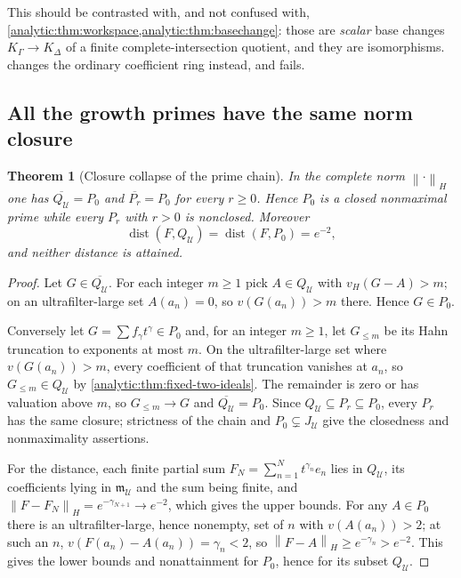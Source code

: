 \documentclass[11pt,letterpaper]{article}
\newtheorem{theorem}{Theorem}[section]
\theoremstyle{definition}
\theoremstyle{remark}
\newcommand{\UU}{\mathcal U}
\newcommand{\m}{\mathfrak m}
\newcommand{\norm}[1]{\left\lVert#1\right\rVert}
\newcommand{\vH}{v_{\!H}}
\numberwithin{equation}{section}
\begin{document}
This should be contrasted with, and not confused with,
\cref{analytic:thm:workspace,analytic:thm:basechange}: those are
\emph{scalar} base changes $K_\Gamma\to K_\Delta$ of a finite
complete-intersection quotient, and they are isomorphisms.
 changes the ordinary coefficient ring
instead, and fails.

\subsection{All the growth primes have the same norm closure}
\label{analytic:subsec:fixed-closure}
\begin{theorem}[Closure collapse of the prime chain]
\label{analytic:thm:fixed-closure}
In the complete norm $\norm{\cdot}_H$ one has
$\overline{Q_\UU}=P_0$ and $\overline{P_r}=P_0$ for every $r\ge0$. Hence
$P_0$ is a closed nonmaximal prime while every $P_r$ with $r>0$ is
nonclosed. Moreover
\begin{equation}\label{analytic:eq:fixed-distance-F}
 \operatorname{dist}(F,Q_\UU)=\operatorname{dist}(F,P_0)=e^{-2},
\end{equation}
and neither distance is attained.
\end{theorem}
\begin{proof}
Let $G\in\overline{Q_\UU}$. For each integer $m\ge1$ pick $A\in Q_\UU$ with
$\vH(G-A)>m$; on an ultrafilter-large set $A(a_n)=0$, so $v(G(a_n))>m$
there. Hence $G\in P_0$.

Conversely let $G=\sum f_\gamma t^\gamma\in P_0$ and, for an integer
$m\ge1$, let $G_{\le m}$ be its Hahn truncation to exponents at most $m$.
On the ultrafilter-large set where $v(G(a_n))>m$, every coefficient of that
truncation vanishes at $a_n$, so $G_{\le m}\in Q_\UU$ by
\cref{analytic:thm:fixed-two-ideals}. The remainder is zero or has
valuation above $m$, so $G_{\le m}\to G$ and
$\overline{Q_\UU}=P_0$. Since $Q_\UU\subseteq P_r\subseteq P_0$, every
$P_r$ has the same closure; strictness of the chain and
$P_0\subsetneq J_\UU$ give the closedness and nonmaximality assertions.

For the distance, each finite partial sum
$F_N=\sum_{n=1}^Nt^{\gamma_n}e_n$ lies in $Q_\UU$, its coefficients lying
in $\m_\UU$ and the sum being finite, and
$\norm{F-F_N}_H=e^{-\gamma_{N+1}}\to e^{-2}$, which gives the upper bounds.
For any $A\in P_0$ there is an ultrafilter-large, hence nonempty, set of
$n$ with $v(A(a_n))>2$; at such an $n$,
$v(F(a_n)-A(a_n))=\gamma_n<2$, so
$\norm{F-A}_H\ge e^{-\gamma_n}>e^{-2}$. This gives the lower bounds and
nonattainment for $P_0$, hence for its subset $Q_\UU$.
\end{proof}
\end{document}
